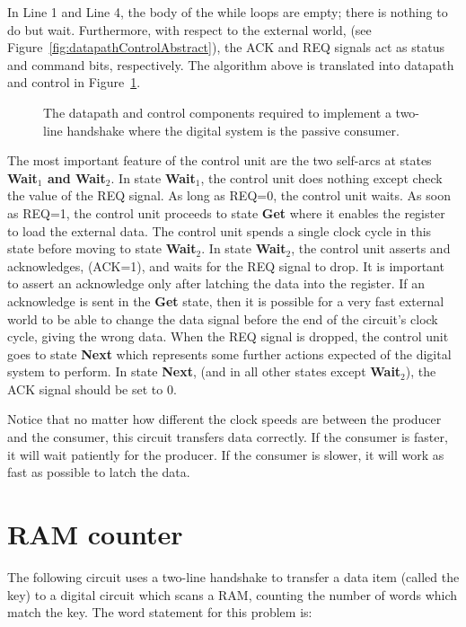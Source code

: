 In Line 1 and Line 4, the body of the while loops are empty; there is nothing
to do but wait.  Furthermore, with respect to the external world, (see
Figure~\ref{fig:datapathControlAbstract}), the ACK and REQ signals act as status and 
command bits, respectively.  The algorithm above is translated into
datapath and control in Figure~\ref{fig:datapathControl2Line}.

\begin{figure}[ht]
\caption{The datapath and control components required to implement
a two-line handshake where the digital system is the passive consumer.}
\label{fig:datapathControl2Line}
\end{figure}

The most important feature of the control unit are the two self-arcs
at states \textbf{ Wait$_1$ and Wait$_2$}.  In state \textbf{ Wait$_1$}, the
control unit does nothing except check the value of the REQ signal.
As long as REQ=0, the control unit waits.  As soon as REQ=1,
the control unit proceeds to state \textbf{ Get} where it enables
the register to load the external data.  The control unit spends a single 
clock cycle in this state before moving to state \textbf{ Wait$_2$}.  In
state \textbf{ Wait$_2$}, the control unit asserts and acknowledges,
(ACK=1), and waits for the REQ signal to drop.  It is important
to assert an acknowledge only after latching the data into
the register.  If an acknowledge is sent in the \textbf{ Get} state,
then it is possible for a very fast external world to be
able to change the data signal before the end of the circuit's 
clock cycle, giving the wrong data.  When the REQ signal is 
dropped, the control unit goes to state \textbf{ Next} which represents 
some further actions expected of the digital system to perform. In 
state \textbf{ Next}, (and in all other states except \textbf{ Wait$_2$}), 
the ACK signal should be set to 0.  

Notice that no matter how different the clock speeds are between the
producer and the consumer, this circuit transfers data correctly.
If the consumer is faster, it will wait patiently for the producer.
If the consumer is slower, it will work as fast as possible to 
latch the data.  


\section{RAM counter}
The following circuit uses a two-line handshake to transfer a
data item (called the key) to a digital circuit which scans a 
RAM, counting the number of words which match the key.  The word 
statement for this problem is:

